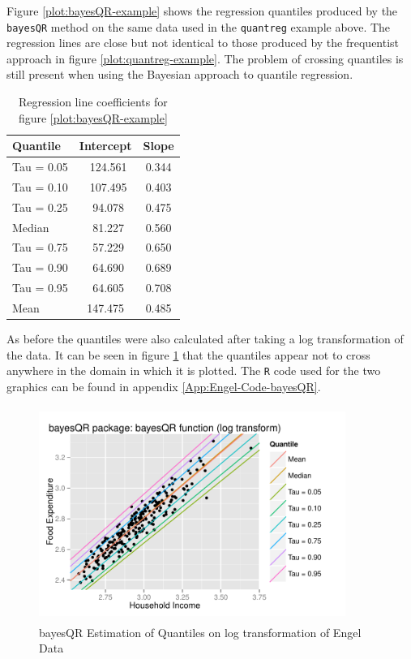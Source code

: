 \documentclass[12pt,a4paper]{report}
\begin{document}
Figure \ref{plot:bayesQR-example} shows the regression quantiles produced by the {\small\verb"bayesQR"} method on the same data used in the {\small\verb"quantreg"} example above. The regression lines are close but not identical to those produced by the frequentist approach in figure \ref{plot:quantreg-example}. The problem of crossing quantiles is still present when using the Bayesian approach to quantile regression.
\vspace{2mm}

\begin{table}[ht]
\begin{center}
\begin{tabular}{|l||c|c|} \hline
\multicolumn{1}{|l||}{Quantile}&\multicolumn{1}{c|}{Intercept}&\multicolumn{1}{c|}{Slope}\tabularnewline
\hline
Tau = 0.05 & ~124.561 & 0.344 \tabularnewline
Tau = 0.10 & ~107.495 & 0.403 \tabularnewline
Tau = 0.25 & ~94.078 & 0.475 \tabularnewline
Median & ~81.227 & 0.560 \tabularnewline
Tau = 0.75 & ~57.229 & 0.650 \tabularnewline
Tau = 0.90 & ~64.690 & 0.689 \tabularnewline
Tau = 0.95 & ~64.605 & 0.708 \tabularnewline
Mean & 147.475 & 0.485 \tabularnewline
\hline
\end{tabular}
\end{center}
\caption{Regression line coefficients for figure \ref{plot:bayesQR-example}}
\label{table:bayesQR-example}
\end{table}

As before the quantiles were also calculated after taking a log transformation of the data. It can be seen in figure \ref{plot:bayesQRlog-example} that the quantiles appear not to cross anywhere in the domain in which it is plotted. The {\small\verb"R"} code used for the two graphics can be found in appendix \ref{App:Engel-Code-bayesQR}.

\begin{figure}[ht]\centering
    \includegraphics[width=10cm,height=7cm]{PlotofBayesQRLog.pdf}
    \caption{bayesQR Estimation of Quantiles on log transformation of Engel Data}
    \label{plot:bayesQRlog-example}
\end{figure}
\end{document}

